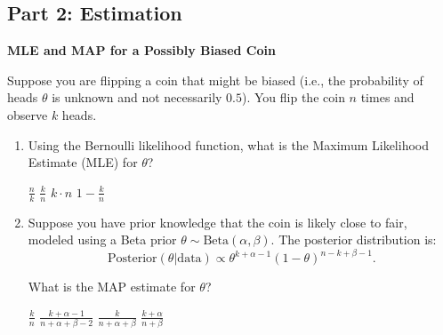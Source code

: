 \documentclass[12pt,letterpaper, onecolumn]{exam}
\begin{document}
\begin{questions}
\clearpage
\section*{Part 2: Estimation}

\question[10 points]\textbf{MLE and MAP for a Possibly Biased Coin}\droppoints

Suppose you are flipping a coin that might be biased (i.e., the probability of heads \( \theta \) is unknown and not necessarily \( 0.5 \)). You flip the coin \( n \) times and observe \( k \) heads.

\begin{enumerate}[label=(\alph*)]
    \item Using the Bernoulli likelihood function, what is the Maximum Likelihood Estimate (MLE) for \( \theta \)?
    \begin{choices}
        \choice \( \frac{n}{k} \)
        \choice \( \frac{k}{n} \)
        \choice \( k \cdot n \)
        \choice \( 1 - \frac{k}{n} \)
    \end{choices}
    \item Suppose you have prior knowledge that the coin is likely close to fair, modeled using a Beta prior \( \theta \sim \text{Beta}(\alpha, \beta) \). The posterior distribution is:
    \[
    \text{Posterior}(\theta | \text{data}) \propto \theta^{k + \alpha - 1} (1 - \theta)^{n - k + \beta - 1}.
    \]

    What is the MAP estimate for \( \theta \)?
    \begin{choices}
        \choice \( \frac{k}{n} \)
        \choice \( \frac{k + \alpha - 1}{n + \alpha + \beta - 2} \)
        \choice \( \frac{k}{n + \alpha + \beta} \)
        \choice \( \frac{k + \alpha}{n + \beta} \)
    \end{choices}
\end{enumerate}

\begin{solution}
    \begin{parts}
        \part 
        \part  
    \end{parts}
\end{solution}




\end{questions}
\end{document}
